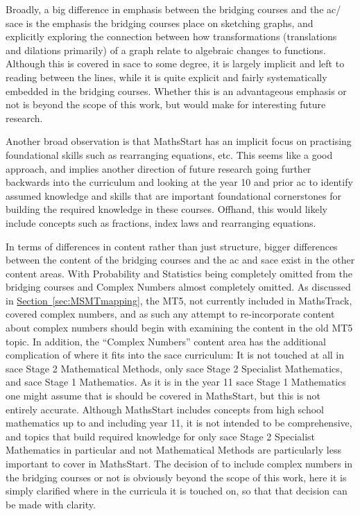 \documentclass[twoside,12pt,a4paper]{report}
\newcommand{\refsec}[1]{\hyperref[sec:#1]{Section~\ref{sec:#1}}}
\begin{document}
Broadly, a big difference in emphasis between the bridging courses and the \gls{ac}/ \gls{sace} is the emphasis the bridging courses place on sketching graphs, and explicitly exploring the connection between how transformations (translations and dilations primarily) of a graph relate to algebraic changes to functions. Although this is covered in \gls{sace} to some degree, it is largely implicit and left to reading between the lines, while it is quite explicit and fairly systematically embedded in the bridging courses. Whether this is an advantageous emphasis or not is beyond the scope of this work, but would make for interesting future research.

Another broad observation is that MathsStart has an implicit focus on practising foundational skills such as rearranging equations, etc. This seems like a good approach, and implies another direction of future research going further backwards into the curriculum and looking at the year 10 and prior \gls{ac} to identify assumed knowledge and skills that are important foundational cornerstones for building the required knowledge in these courses. Offhand, this would likely include concepts such as fractions, index laws and rearranging equations. 

In terms of differences in content rather than just structure, bigger differences between the content of the bridging courses and the \gls{ac} and \gls{sace} exist in the other content areas. With Probability and Statistics being completely omitted from the bridging courses and Complex Numbers almost completely omitted. As discussed in \refsec{MSMTmapping}, the MT5, not currently included in MathsTrack, covered complex numbers, and as such any attempt to re-incorporate content about complex numbers should begin with examining the content in the old MT5 topic. In addition, the ``Complex Numbers'' content area has the additional complication of where it fits into the \gls{sace} curriculum: It is not touched at all in \gls{sace} Stage 2 Mathematical Methods, only \gls{sace} Stage 2 Specialist Mathematics, and \gls{sace} Stage 1 Mathematics. As it is in the year 11 \gls{sace} Stage 1 Mathematics one might assume that is should be covered in MathsStart, but this is not entirely accurate. Although MathsStart includes concepts from high school mathematics up to and including year 11, it is not intended to be comprehensive, and topics that build required knowledge for only \gls{sace} Stage 2 Specialist Mathematics in particular and not Mathematical Methods are particularly less important to cover in MathsStart. The decision of to include complex numbers in the bridging courses or not is obviously beyond the scope of this work, here it is simply clarified where in the curricula it is touched on, so that that decision can be made with clarity.
\end{document}
